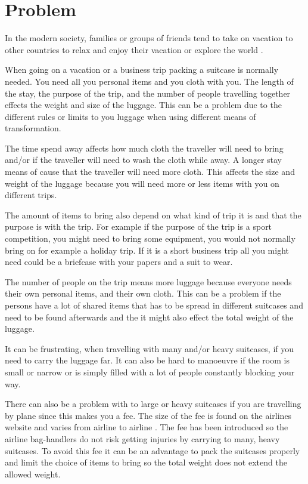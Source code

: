 \section{Problem}
In the modern society, families or groups of friends tend to take on vacation to other countries to relax and enjoy their vacation or explore the world \citep{danskecharter}.

When going on a vacation or a business trip packing a suitcase is normally needed. You need all you personal items and you cloth with you. The length of the stay, the purpose of the trip, and the number of people travelling together effects the weight and size of the luggage. This can be a problem due to the different rules or limits to you luggage when using different means of transformation.

The time spend away affects how much cloth the traveller will need to bring and/or if the traveller will need to wash the cloth while away. A longer stay means of cause that the traveller will need more cloth. This affects the size and weight of the luggage because you will need more or less items with you on different trips.
 
The amount of items to bring also depend on what kind of trip it is and that the purpose is with the trip. For example if the purpose of the trip is a sport competition, you might need to bring some equipment, you would not normally bring on for example a holiday trip. If it is a short business trip all you might need could be a briefcase with your papers and a suit to wear.

The number of people on the trip means more luggage because everyone needs their own personal items, and their own cloth. This can be a problem if the persons have a lot of shared items that has to be spread in different suitcases and need to be found afterwards and the it might also effect the total weight of the luggage.

It can be frustrating, when travelling with many and/or heavy suitcases, if you need to carry the luggage far. It can also be hard to manoeuvre if the room is small or narrow or is simply filled with a lot of people constantly blocking your way.
 
There can also be a problem with to large or heavy suitcases if you are travelling by plane since this makes you a fee. The size of the fee is found on the airlines website and varies from airline to airline \citep{altombag}. The fee has been introduced so the airline bag-handlers do not risk getting injuries by carrying to many, heavy suitcases. 
To avoid this fee it can be an advantage to pack the suitcases properly and limit the choice of items to bring so the total weight does not extend the allowed weight.


